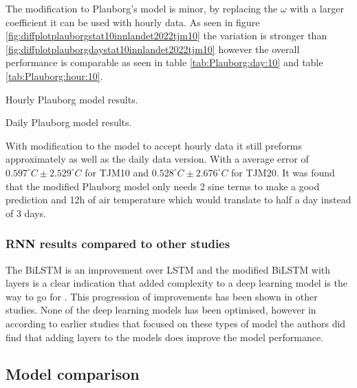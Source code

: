 The modification to Plauborg's model is minor, by replacing the $\omega$ with a larger coefficient it can be used with hourly data. As seen in figure \ref{fig:diffplotplauborgstat10innlandet2022tjm10} the variation is stronger than \ref{fig:diffplotplauborgdaystat10innlandet2022tjm10} however the overall performance is comparable as seen in table \ref{tab:Plauborg:day:10} and table \ref{tab:Plauborg:hour:10}. 

\begin{table}[t]
	\centering
	\resizebox{\textwidth}{!}{
		
	}
	\caption{Hourly Plauborg model results.}
	\label{tab:plauborg_hour_res}
\end{table}

\begin{table}[t]
	\centering
	\resizebox{\textwidth}{!}{
		
	}
	\caption{Daily Plauborg model results.}
	\label{tab:plauborg_day_res}
\end{table}

With modification to the model to accept hourly data it still preforms approximately as well as the daily data version. With a average error of $0.597^\circ C \pm 2.529^\circ C$ for TJM10 and $0.528^\circ C \pm 2.676^\circ C$ for TJM20. It was found that the modified Plauborg model only needs 2 sine terms to make a good prediction and 12h of air temperature which would translate to half a day instead of 3 days.
 
\subsubsection{RNN results compared to other studies}
 
The BiLSTM is an improvement over LSTM and the modified BiLSTM with layers is a clear indication that added complexity to a deep learning model is the way to go for . This progression of improvements has been shown in other studies\cite{feng_estimation_2019,citakoglu_comparison_2017,li_attention-aware_2022,li_gans-lstm_2020,wang_modeling_2022}. None of the deep learning models has been optimised, however in according to earlier studies that focused on these types of model the authors did find that adding layers to the models does improve the model performance. 

\subsection{Model comparison}

